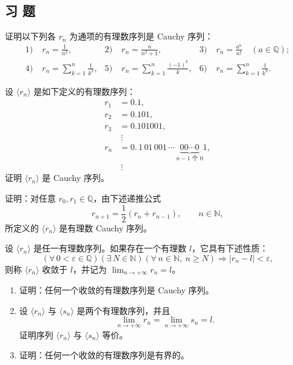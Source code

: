 \subsection{习 题}

\begin{exercise}
  \item 证明以下列各 \(r_n\) 为通项的有理数序列是 Cauchy 序列：
  \[
  \begin{alignedat}{3}
    1)\;& r_n=\frac{1}{n^2},\qquad&
    2)\;& r_n=\frac{n}{n^3+1},\qquad&
    3)\;& r_n=\frac{a^n}{n!}\quad(a\in\mathbb{Q});\\
    4)\;& r_n=\sum_{k=1}^{n}\frac{1}{k^2},&
    5)\;& r_n=\sum_{k=1}^{n}\frac{(-1)^k}{k},&
    6)\;& r_n=\sum_{k=1}^{n}\frac{1}{k^k}.
  \end{alignedat}
  \]
\end{exercise}

\begin{exercise}
  \item 设 \(\langle r_n\rangle\) 是如下定义的有理数序列：
  \[
  \begin{aligned}
    r_1&=0.1,\\
    r_2&=0.101,\\
    r_3&=0.101001,\\[-2pt]
       &\ \vdots\\[-2pt]
    r_n&=0.\,1\,01\,001\,\cdots\,
    \underbrace{00\cdots 0}_{n-1\text{ 个 }0}1,\\[-2pt]
       &\ \vdots
  \end{aligned}
  \]
  证明 \(\langle r_n\rangle\) 是 Cauchy 序列。
\end{exercise}

\begin{exercise}
  \item 证明：对任意 \(r_0,r_1\in\mathbb{Q}\)，由下述递推公式
  \[
  r_{n+1}=\frac{1}{2}(r_n+r_{n-1}),\qquad n\in\mathbb{N},
  \]
  所定义的 \(\langle r_n\rangle\) 是有理数 Cauchy 序列。
\end{exercise}

\begin{exercise}
  \item 设 \(\langle r_n\rangle\) 是任一有理数序列。如果存在一个有理数 \(l\)，它具有下述性质：
  \[
  (\forall\,0<\varepsilon\in\mathbb{Q})(\exists\,N\in\mathbb{N})
  (\forall\,n\in\mathbb{N},\ n\geq N)
  \Longrightarrow |r_n-l|<\varepsilon,
  \]
  则称 \(\langle r_n\rangle\) 收敛于 \(l\)，并记为
  \(\displaystyle\lim_{n\to+\infty}r_n=l\)。
  \begin{enumerate}[label=\arabic*)]
    \item 证明：任何一个收敛的有理数序列是 Cauchy 序列。
    \item 设 \(\langle r_n\rangle\) 与 \(\langle s_n\rangle\) 是两个有理数序列，并且
    \[
    \lim_{n\to+\infty}r_n=\lim_{n\to+\infty}s_n=l.
    \]
    证明序列 \(\langle r_n\rangle\) 与 \(\langle s_n\rangle\) 等价。
    \item 证明：任何一个收敛的有理数序列是有界的。
  \end{enumerate}
\end{exercise}

